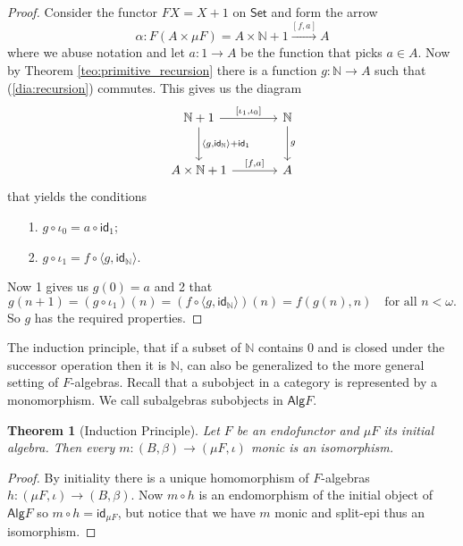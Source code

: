 \documentclass[letterpaper, 11pt, oneside]{memoir}
\theoremstyle{myteo}
\newtheorem{theorem}{Theorem}[section]
\numberwithin{equation}{section}
\newcommand{\id}{\textsf{id}}
\newcommand{\alg}{\textsf{Alg}}
\newcommand{\Set}{\textsf{Set}}
\newcommand{\N}{\mathbb{N}}
\newcommand{\outofcoprod}[2]{{[#1, #2]}}
\newcommand{\intoprod}[2]{{\langle #1, #2\rangle}}
\begin{document}
\begin{proof}
  Consider the functor \(FX = X + 1\) on \(\Set\) and form the arrow
  \begin{equation*}
    \alpha \colon F(A \times \mu F) = A \times \N + 1 \xrightarrow{\outofcoprod{f}{a}} A
  \end{equation*}
  where we abuse notation and let \(a : 1 \to A\) be the function that picks \(a \in A\).
  Now by Theorem \ref{teo:primitive_recursion} there is a function \(g \colon \N \to A\) such that (\ref{dia:recursion}) commutes.
  This gives us the diagram
  \begin{equation}
    \begin{tikzcd}[sep = large]
      \N + 1 \ar[r, "\outofcoprod{\iota_1}{\iota_0}"] \ar[d, "\intoprod{g}{\id_\N} + \id_1"] & \N \ar[d, "g"]\\
      A \times \N + 1 \ar[r, "\outofcoprod{f}{a}"] & A
    \end{tikzcd}
  \end{equation}
  that yields the conditions
  \begin{enumerate}
  \item[1.] \(g \circ \iota_0 = a \circ \id_1\);
  \item[2.] \(g \circ \iota_1 = f \circ \intoprod{g}{\id_\N}\).
  \end{enumerate}
  Now 1 gives us \(g(0) = a\) and 2 that
  \begin{equation*}
    g(n + 1) = (g \circ \iota_1)(n) = (f \circ \intoprod{g}{\id_\N})(n) = f(g(n), n) \quad \text{for all \(n < \omega\).}
  \end{equation*}
  So \(g\) has the required properties.
\end{proof}

The induction principle, that if a subset of \(\N\) contains \(0\) and is closed under the successor operation then it is \(\N\), can also be generalized to the more general setting of \(F\)-algebras.
Recall that a subobject in a category is represented by a monomorphism.
We call subalgebras subobjects in \(\alg F\).

\begin{theorem}[Induction Principle]
  \label{th:induction_principle}
  Let \(F\) be an endofunctor and \(\mu F\) its initial algebra.
  Then every \(m \colon (B, \beta) \to (\mu F, \iota)\) monic is an isomorphism.
\end{theorem}

\begin{proof}
  By initiality there is a unique homomorphism of \(F\)-algebras \(h \colon (\mu F, \iota) \to (B, \beta)\).
  Now \(m \circ h\) is an endomorphism of the initial object of \(\alg F\) so \(m \circ h = \id_{\mu F}\), but notice that we have \(m\) monic and split-epi thus an isomorphism.
\end{proof}
\end{document}
